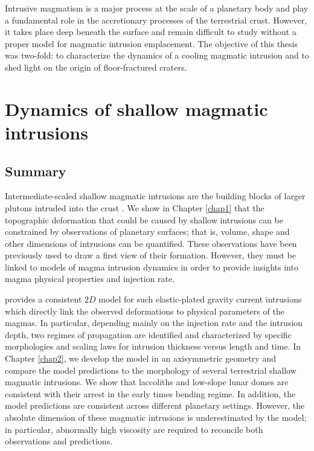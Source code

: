 Intrusive magmatism  is a major  process at  the scale of  a planetary
body and play a fundamental role  in the accretionary processes of the
terrestrial crust. However,  it takes  place deep beneath  the surface  and remain
difficult  to study  without  a proper  model  for magmatic  intrusion
emplacement.  The objective of this thesis was two-fold: to characterize the
dynamics of  a cooling  magmatic intrusion  and to  shed light  on the
origin of floor-fractured craters. 

\section*{Dynamics of shallow magmatic intrusions}

\subsection*{Summary}
\label{sec:summary}

Intermediate-scaled  shallow  magmatic  intrusions  are  the  building
blocks    of    larger    plutons     intruded    into    the    crust
\citep{Petford:2000cc,Glazner:2004gv}.  We show in Chapter \ref{chap1}
that  the topographic  deformation  that could  be  caused by  shallow
intrusions can  be constrained by observations  of planetary surfaces;
that  is, volume,  shape and  other  dimensions of  intrusions can  be
quantified. These  observations have  been previously  used to  draw a
first view of their formation.  However, they must be linked to models
of magma  intrusion dynamics in  order to provide insights  into magma
physical properties and injection rate.

\citet{Michaut:2011kg}  provides  a  consistent $2D$  model  for  such
elastic-plated  gravity current  intrusions  which  directly link  the
observed  deformations  to  physical  parameters of  the  magmas.   In
particular, depending mainly  on the injection rate  and the intrusion
depth, two regimes of propagation  are identified and characterized by
specific morphologies and scaling  laws for intrusion thickness versus
length and time.   In Chapter \ref{chap2}, we develop the  model in an
axisymmetric  geometry  and  compare  the  model  predictions  to  the
morphology  of several  terrestrial shallow  magmatic intrusions.   We
show that  laccoliths and  low-slope lunar  domes are  consistent with
their arrest in the early times bending regime. In addition, the model
predictions    are     consistent    across     different    planetary
settings. However, the absolute dimension of these magmatic intrusions
is  underestimated  by  the  model;  in  particular,  abnormally  high
viscosity are required to reconcile both observations and predictions.

